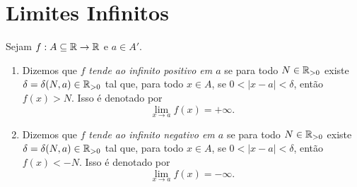 \section{Limites Infinitos}

\begin{definition}
    Sejam $f : A \subseteq \mathbb{R} \to \mathbb{R}$ e $a \in A'$.
        \begin{enumerate}[leftmargin=*, align=left, label=\textbf{(\alph*)}]
            \item Dizemos que $f$ \emph{tende ao infinito positivo em $a$} se para todo $N \in \mathbb{R}_{>0}$ existe $\delta = \delta(N,a) \in \mathbb{R}_{>0}$ tal que, para todo $x \in A$, se $0<|x-a|<\delta$, então $f(x) > N$. Isso é denotado por
                \[
                    \lim_{x \to a} f(x) = +\infty.
                \]
            \item Dizemos que $f$ \emph{tende ao infinito negativo em $a$} se para todo $N \in \mathbb{R}_{>0}$ existe $\delta = \delta(N,a) \in \mathbb{R}_{>0}$ tal que, para todo $x \in A$, se $0<|x-a|<\delta$, então $f(x) < -N$. Isso é denotado por
                \[
                    \lim_{x \to a} f(x) = -\infty.
                \]
        \end{enumerate}
\end{definition}

